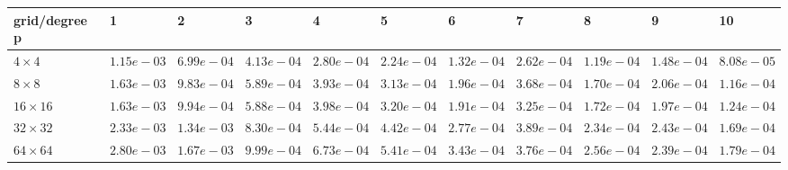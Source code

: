 \begin{tabular}{lllllllllll}
\hline
 grid/degree p   & 1          & 2          & 3          & 4          & 5          & 6          & 7          & 8          & 9          & 10         \\
\hline
 $4 \times 4$    & $1.15e-03$ & $6.99e-04$ & $4.13e-04$ & $2.80e-04$ & $2.24e-04$ & $1.32e-04$ & $2.62e-04$ & $1.19e-04$ & $1.48e-04$ & $8.08e-05$ \\
 $8 \times 8$    & $1.63e-03$ & $9.83e-04$ & $5.89e-04$ & $3.93e-04$ & $3.13e-04$ & $1.96e-04$ & $3.68e-04$ & $1.70e-04$ & $2.06e-04$ & $1.16e-04$ \\
 $16 \times 16$  & $1.63e-03$ & $9.94e-04$ & $5.88e-04$ & $3.98e-04$ & $3.20e-04$ & $1.91e-04$ & $3.25e-04$ & $1.72e-04$ & $1.97e-04$ & $1.24e-04$ \\
 $32 \times 32$  & $2.33e-03$ & $1.34e-03$ & $8.30e-04$ & $5.44e-04$ & $4.42e-04$ & $2.77e-04$ & $3.89e-04$ & $2.34e-04$ & $2.43e-04$ & $1.69e-04$ \\
 $64 \times 64$  & $2.80e-03$ & $1.67e-03$ & $9.99e-04$ & $6.73e-04$ & $5.41e-04$ & $3.43e-04$ & $3.76e-04$ & $2.56e-04$ & $2.39e-04$ & $1.79e-04$ \\
\hline
\end{tabular}